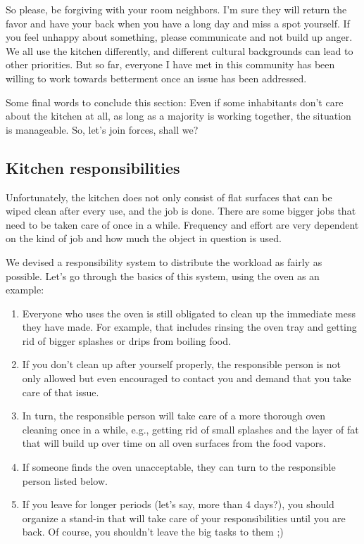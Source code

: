 So please, be forgiving with your room neighbors. I'm sure they will return the favor and have your back when you have a long day and miss a spot yourself. If you feel unhappy about something, please communicate and not build up anger. We all use the kitchen differently, and different cultural backgrounds can lead to other priorities. But so far, everyone I have met in this community has been willing to work towards betterment once an issue has been addressed.

Some final words to conclude this section: Even if some inhabitants don't care about the kitchen at all, as long as a majority is working together, the situation is manageable. So, let's join forces, shall we?

\subsection{Kitchen responsibilities}

Unfortunately, the kitchen does not only consist of flat surfaces that can be wiped clean after every use, and the job is done. There are some bigger jobs that need to be taken care of once in a while. Frequency and effort are very dependent on the kind of job and how much the object in question is used.

We devised a responsibility system to distribute the workload as fairly as possible. Let's go through the basics of this system, using the oven as an example:
\begin{enumerate}
    \item Everyone who uses the oven is still obligated to clean up the immediate mess they have made. For example, that includes rinsing the oven tray and getting rid of bigger splashes or drips from boiling food.
    \item If you don't clean up after yourself properly, the responsible person is not only allowed but even encouraged to contact you and demand that you take care of that issue.
    \item In turn, the responsible person will take care of a more thorough oven cleaning once in a while, e.g., getting rid of small splashes and the layer of fat that will build up over time on all oven surfaces from the food vapors.
    \item If someone finds the oven unacceptable, they can turn to the responsible person listed below.
    \item If you leave for longer periods (let's say, more than 4 days?), you should organize a stand-in that will take care of your responsibilities until you are back. Of course, you shouldn't leave the big tasks to them ;)
\end{enumerate}

